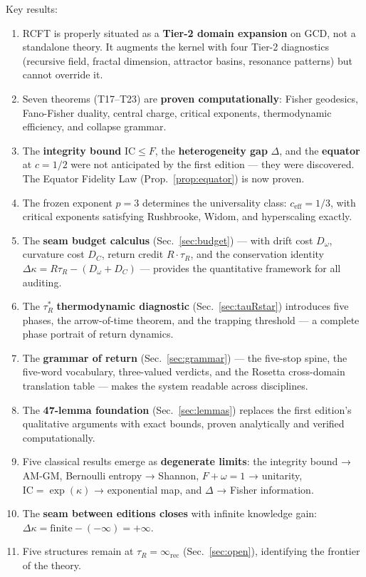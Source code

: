 \documentclass[
  aps,
  prd,
  preprint,
  superscriptaddress,
  nofootinbib,
  floatfix,
  longbibliography
]{revtex4-2}
\newcommand{\tR}{\tau_{\!R}}
\newcommand{\tRstar}{\tau_{\!R}^{*}}
\newcommand{\IC}{\mathrm{IC}}
\newcommand{\Fid}{F}
\newcommand{\Drft}{\omega}
\newcommand{\Curv}{C}
\newcommand{\Logint}{\kappa}
\newcommand{\ceff}{c_{\mathrm{eff}}}
\newcommand{\hetgap}{\Delta}
\begin{document}
Key results:
\begin{enumerate}[nosep,leftmargin=*]
  \item RCFT is properly situated as a \textbf{Tier-2 domain
    expansion} on GCD, not a standalone theory. It augments
    the kernel with four Tier-2 diagnostics
    (recursive field, fractal dimension, attractor basins,
    resonance patterns) but cannot override it.
  \item Seven theorems (T17–T23) are \textbf{proven
    computationally}: Fisher geodesics, Fano-Fisher duality,
    central charge, critical exponents, thermodynamic
    efficiency, and collapse grammar.
  \item The \textbf{integrity bound} $\IC \leq \Fid$, the
    \textbf{heterogeneity gap} $\hetgap$, and the
    \textbf{equator} at $c = 1/2$ were not anticipated
    by the first edition — they were discovered.
    The Equator Fidelity Law (Prop.~\ref{prop:equator})
    is now proven.
  \item The frozen exponent $p = 3$ determines the universality
    class: $\ceff = 1/3$, with critical exponents satisfying
    Rushbrooke, Widom, and hyperscaling exactly.
  \item The \textbf{seam budget calculus}
    (Sec.~\ref{sec:budget}) — with drift cost $D_\Drft$,
    curvature cost $D_\Curv$, return credit $R \cdot \tR$,
    and the conservation identity
    $\Delta\Logint = R\tR - (D_\Drft + D_\Curv)$ —
    provides the quantitative framework for all auditing.
  \item The $\tRstar$ \textbf{thermodynamic diagnostic}
    (Sec.~\ref{sec:tauRstar}) introduces five phases, the
    arrow-of-time theorem, and the trapping threshold
    — a complete phase portrait of return dynamics.
  \item The \textbf{grammar of return}
    (Sec.~\ref{sec:grammar}) — the five-stop spine,
    the five-word vocabulary, three-valued verdicts,
    and the Rosetta cross-domain translation table —
    makes the system readable across disciplines.
  \item The \textbf{47-lemma foundation}
    (Sec.~\ref{sec:lemmas}) replaces the first edition's
    qualitative arguments with exact bounds, proven
    analytically and verified computationally.
  \item Five classical results emerge as \textbf{degenerate
    limits}: the integrity bound → AM-GM, Bernoulli entropy →
    Shannon, $\Fid + \Drft = 1$ → unitarity,
    $\IC = \exp(\Logint)$ → exponential map,
    and $\hetgap$ → Fisher information.
  \item The \textbf{seam between editions closes} with infinite
    knowledge gain:
    $\Delta\Logint = \mathrm{finite} - (-\infty) = +\infty$.
  \item Five structures remain at
    $\tR = \infty_{\mathrm{rec}}$ (Sec.~\ref{sec:open}),
    identifying the frontier of the theory.
\end{enumerate}
\end{document}
